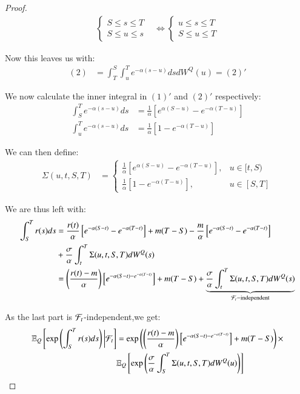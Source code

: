 \begin{proof}
\begin{align*}
\begin{cases}
 S \leq s \leq T \\ 
 S \leq u \leq s
\end{cases}
&\iff
\begin{cases}
 u \leq s \leq T \\ 
 S \leq u \leq T
\end{cases}
\end{align*}

Now this leaves us with: 
\begin{align*}
(2) &= \int_{T}^{S}\int_{u}^{T}e^{-\alpha(s-u)}dsdW^{Q}(u) = (2)'
\end{align*}

We now calculate the inner integral in $(1)'$ and $(2)'$ respectively: 
\begin{align*}
\int_{S}^{T}e^{-\alpha(s-u)}ds &= \frac{1}{\alpha}\left[
e^{\alpha(S-u)}-e^{-\alpha(T-u)}
\right] \\ 
\int_{u}^{T}e^{-\alpha(s-u)}ds &= \frac{1}{\alpha}\left[
1 -e^{-\alpha(T-u)}
\right]
\end{align*}

We can then define: 
\begin{align*}
\Sigma(u,t,S,T) &= 
    \begin{cases}
      \frac{1}{\alpha}\left[
      e^{\alpha(S-u)}-e^{-\alpha(T-u)}\right],  & u \in [t,S)\\
      \frac{1}{\alpha}\left[1 -e^{-\alpha(T-u)}\right], & u\in [S,T]
    \end{cases}
\end{align*}

We are thus left with: 
\begin{align*}
\int_{S}^{T}r(s)ds &= \frac{r(t)}{\alpha}\left[
e^{-\alpha(S-t)} - e^{-\alpha(T-t)}
\right]   
+ m(T-S) - \frac{m}{\alpha}\left[
e^{-\alpha(S-t)} - e^{-\alpha(T-t)}
\right] \\
&+ \frac{\sigma}{\alpha}\int_{t}^{T}\Sigma(u,t,S,T)dW^{Q}(s) \\ 
&= 
\left(
\frac{r(t)-m}{\alpha}
\right)
\left[
e^{-\alpha(S-t) - e^{-\alpha(T-t)}}
\right]
+ m(T-S) 
+ 
\underbrace{
\frac{\sigma}{\alpha}\int_{t}^{T}\Sigma(u,t,S,T)dW^{Q}(s)
}_{\mathcal{F}_{t}-\text{independent}}
\end{align*}


As the last part is $\mathcal{F}_{t}$-independent,we get: 
\begin{align*}
\mathbb{E}_{Q}\left[
\exp\left(
\int_{S}^{T}r(s)ds
\right)\bigg{|}\mathcal{F}_{t}
\right] 
&= 
\exp\left(
\left(
\frac{r(t)-m}{\alpha}
\right)
\left[
e^{-\alpha(S-t) - e^{-\alpha(T-t)}}
\right]
+ m(T-S) 
\right)\times \\ 
&\mathbb{E}_{Q}\left[
\exp\left(
\frac{\sigma}{\alpha}\int_{S}^{T}\Sigma(u,t,S,T)dW^{Q}(u)
\right)
\right]
\end{align*}


\end{proof}
